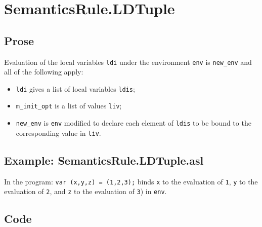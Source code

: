 \documentclass{book}
\begin{document}

\section{SemanticsRule.LDTuple \label{sec:SemanticsRule.LDTuple}}

    \subsection{Prose}
Evaluation of the local variables \texttt{ldi} under the environment
\texttt{env} is \texttt{new\_env} and all of the following apply:
    \begin{itemize}
    \item \texttt{ldi} gives a list of local variables \texttt{ldis};
    \item \texttt{m\_init\_opt} is a list of values \texttt{liv};
    \item \texttt{new\_env} is \texttt{env} modified to declare each element of \texttt{ldis} to be bound
      to the corresponding value in \texttt{liv}.
    \end{itemize}

    \subsection{Example: SemanticsRule.LDTuple.asl}
    In the program:
    \texttt{var (x,y,z) = (1,2,3);} binds \texttt{x} to the evaluation of
\texttt{1}, \texttt{y} to the evaluation of \texttt{2}, and \texttt{z} to the
evaluation of \texttt{3}) in \texttt{env}.

  \subsection{Code}
\end{document}
